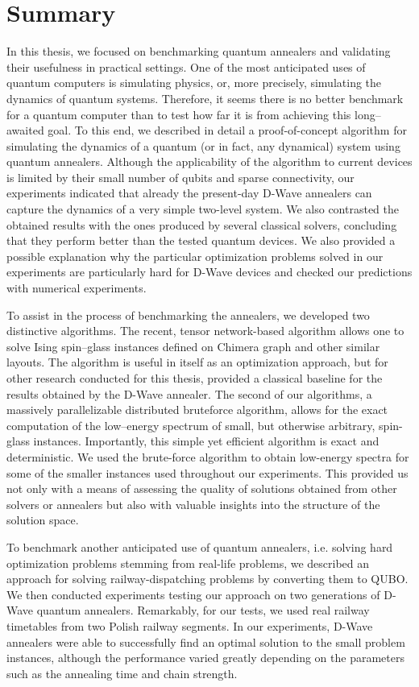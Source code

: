 \chapter*{Summary}

In this thesis, we focused on benchmarking quantum annealers and validating their
usefulness in practical settings. One of the most anticipated uses of quantum computers
is simulating physics, or, more precisely, simulating the dynamics of quantum systems.
Therefore, it seems there is no better benchmark for a quantum computer than to test
how far it is from achieving this long--awaited goal. To this end, we described in detail a
proof-of-concept algorithm for simulating the dynamics of a quantum (or in fact, any
dynamical) system using quantum annealers. Although the applicability of the algorithm
to current devices is limited by their small number of qubits and sparse connectivity,
our experiments indicated that already the present-day D-Wave annealers can capture
the dynamics of a very simple two-level system. We also contrasted the obtained results
with the ones produced by several classical solvers, concluding that they perform better
than the tested quantum devices. We also provided a possible explanation why the
particular optimization problems solved in our experiments are particularly hard for
D-Wave devices and checked our predictions with numerical experiments.

To assist in the process of benchmarking the annealers, we developed two distinctive
algorithms. The recent, tensor network-based algorithm allows one to solve Ising
spin--glass instances defined on Chimera graph and other similar layouts. The algorithm
is useful in itself as an optimization approach, but for other research conducted for
this thesis, provided a classical baseline for the results obtained by the D-Wave
annealer. The second of our algorithms, a massively parallelizable distributed bruteforce
algorithm, allows for the exact computation of the low--energy spectrum of small,
but otherwise arbitrary, spin-glass instances. Importantly, this simple yet
efficient algorithm is exact and deterministic. We used the brute-force algorithm
to obtain low-energy spectra for some of the smaller instances used throughout
our experiments. This provided us not only with a means of assessing the quality of
solutions obtained from other solvers or annealers but also with valuable
insights into the structure of the solution space.

To benchmark another anticipated use of quantum annealers, i.e. solving hard
optimization problems stemming from real-life problems, we described an approach
for solving railway-dispatching problems by converting them to QUBO. We then
conducted experiments testing our approach on two generations of D-Wave quantum
annealers. Remarkably, for our tests, we used real railway timetables from two Polish
railway segments. In our experiments, D-Wave annealers were able to successfully
find an optimal solution to the small problem instances, although the performance
varied greatly depending on the parameters such as the annealing time and chain strength.

